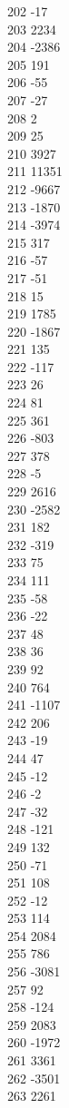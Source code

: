 { 202	-17 \\
 203	2234 \\
 204	-2386 \\
 205	191 \\
 206	-55 \\
 207	-27 \\
 208	2 \\
 209	25 \\
 210	3927 \\
 211	11351 \\
 212	-9667 \\
 213	-1870 \\
 214	-3974 \\
 215	317 \\
 216	-57 \\
 217	-51 \\
 218	15 \\
 219	1785 \\
 220	-1867 \\
 221	135 \\
 222	-117 \\
 223	26 \\
 224	81 \\
 225	361 \\
 226	-803 \\
 227	378 \\
 228	-5 \\
 229	2616 \\
 230	-2582 \\
 231	182 \\
 232	-319 \\
 233	75 \\
 234	111 \\
 235	-58 \\
 236	-22 \\
 237	48 \\
 238	36 \\
 239	92 \\
 240	764 \\
 241	-1107 \\
 242	206 \\
 243	-19 \\
 244	47 \\
 245	-12 \\
 246	-2 \\
 247	-32 \\
 248	-121 \\
 249	132 \\
 250	-71 \\
 251	108 \\
 252	-12 \\
 253	114 \\
 254	2084 \\
 255	786 \\
 256	-3081 \\
 257	92 \\
 258	-124 \\
 259	2083 \\
 260	-1972 \\
 261	3361 \\
 262	-3501 \\
 263	2261 \\
}
